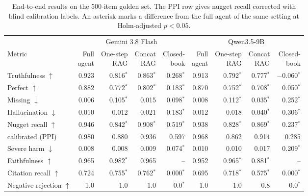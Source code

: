 \begin{table}[tb]
\centering
\caption{End-to-end results on the 500-item golden set. The PPI row gives nugget recall corrected with blind calibration labels. An asterisk marks a difference from the full agent of the same setting at Holm-adjusted $p<0.05$.}\label{tab:e2e-main}
\scriptsize
\setlength{\tabcolsep}{3.5pt}
\begin{tabular}{lrrrrrrrr}
\toprule
 & \multicolumn{4}{c}{Gemini 3.8 Flash} & \multicolumn{4}{c}{Qwen3.5-9B} \\
\cmidrule(lr){2-5}\cmidrule(lr){6-9}
Metric & \colhead{Full\\agent} & \colhead{One-step\\RAG} & \colhead{Concat\\RAG} & \colhead{Closed-\\book} & \colhead{Full\\agent} & \colhead{One-step\\RAG} & \colhead{Concat\\RAG} & \colhead{Closed-\\book} \\
\midrule
Truthfulness $\uparrow$ & 0.923 & 0.816$^{*}$ & 0.863$^{*}$ & 0.268$^{*}$ & 0.913 & 0.792$^{*}$ & 0.777$^{*}$ & $-$0.060$^{*}$ \\
Perfect $\uparrow$ & 0.882 & 0.772$^{*}$ & 0.802$^{*}$ & 0.183$^{*}$ & 0.870 & 0.752$^{*}$ & 0.708$^{*}$ & 0.050$^{*}$ \\
Missing $\downarrow$ & 0.006 & 0.105$^{*}$ & 0.015 & 0.098$^{*}$ & 0.008 & 0.112$^{*}$ & 0.035$^{*}$ & 0.252$^{*}$ \\
Hallucination $\downarrow$ & 0.010 & 0.012 & 0.021 & 0.183$^{*}$ & 0.012 & 0.018 & 0.040$^{*}$ & 0.306$^{*}$ \\
Nugget recall $\uparrow$ & 0.946 & 0.842$^{*}$ & 0.908$^{*}$ & 0.519$^{*}$ & 0.938 & 0.828$^{*}$ & 0.869$^{*}$ & 0.237$^{*}$ \\
\quad calibrated (PPI) & 0.980 & 0.880 & 0.936 & 0.597 & 0.968 & 0.862 & 0.914 & 0.285 \\
\midrule
Severe harm $\downarrow$ & 0.008 & 0.008 & 0.009 & 0.074$^{*}$ & 0.010 & 0.010 & 0.017 & 0.209$^{*}$ \\
Faithfulness $\uparrow$ & 0.965 & 0.982$^{*}$ & 0.965 & -- & 0.952 & 0.965$^{*}$ & 0.881$^{*}$ & -- \\
Citation recall $\uparrow$ & 0.724 & 0.755$^{*}$ & 0.762$^{*}$ & 0.000$^{*}$ & 0.695 & 0.718$^{*}$ & 0.575$^{*}$ & 0.000$^{*}$ \\
\midrule
Negative rejection $\uparrow$ & 1.0 & 1.0 & 1.0 & 0.0$^{*}$ & 1.0 & 1.0 & 0.8 & 0.0$^{*}$ \\

\end{tabular}
\end{table}
